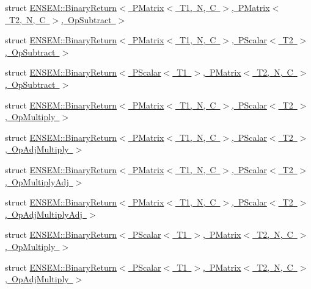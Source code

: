 \begin{DoxyCompactItemize}
\item 
struct \mbox{\hyperlink{structENSEM_1_1BinaryReturn_3_01PMatrix_3_01T1_00_01N_00_01C_01_4_00_01PMatrix_3_01T2_00_01N_00_01C_01_4_00_01OpSubtract_01_4}{E\+N\+S\+E\+M\+::\+Binary\+Return$<$ P\+Matrix$<$ T1, N, C $>$, P\+Matrix$<$ T2, N, C $>$, Op\+Subtract $>$}}
\item 
struct \mbox{\hyperlink{structENSEM_1_1BinaryReturn_3_01PMatrix_3_01T1_00_01N_00_01C_01_4_00_01PScalar_3_01T2_01_4_00_01OpSubtract_01_4}{E\+N\+S\+E\+M\+::\+Binary\+Return$<$ P\+Matrix$<$ T1, N, C $>$, P\+Scalar$<$ T2 $>$, Op\+Subtract $>$}}
\item 
struct \mbox{\hyperlink{structENSEM_1_1BinaryReturn_3_01PScalar_3_01T1_01_4_00_01PMatrix_3_01T2_00_01N_00_01C_01_4_00_01OpSubtract_01_4}{E\+N\+S\+E\+M\+::\+Binary\+Return$<$ P\+Scalar$<$ T1 $>$, P\+Matrix$<$ T2, N, C $>$, Op\+Subtract $>$}}
\item 
struct \mbox{\hyperlink{structENSEM_1_1BinaryReturn_3_01PMatrix_3_01T1_00_01N_00_01C_01_4_00_01PScalar_3_01T2_01_4_00_01OpMultiply_01_4}{E\+N\+S\+E\+M\+::\+Binary\+Return$<$ P\+Matrix$<$ T1, N, C $>$, P\+Scalar$<$ T2 $>$, Op\+Multiply $>$}}
\item 
struct \mbox{\hyperlink{structENSEM_1_1BinaryReturn_3_01PMatrix_3_01T1_00_01N_00_01C_01_4_00_01PScalar_3_01T2_01_4_00_01OpAdjMultiply_01_4}{E\+N\+S\+E\+M\+::\+Binary\+Return$<$ P\+Matrix$<$ T1, N, C $>$, P\+Scalar$<$ T2 $>$, Op\+Adj\+Multiply $>$}}
\item 
struct \mbox{\hyperlink{structENSEM_1_1BinaryReturn_3_01PMatrix_3_01T1_00_01N_00_01C_01_4_00_01PScalar_3_01T2_01_4_00_01OpMultiplyAdj_01_4}{E\+N\+S\+E\+M\+::\+Binary\+Return$<$ P\+Matrix$<$ T1, N, C $>$, P\+Scalar$<$ T2 $>$, Op\+Multiply\+Adj $>$}}
\item 
struct \mbox{\hyperlink{structENSEM_1_1BinaryReturn_3_01PMatrix_3_01T1_00_01N_00_01C_01_4_00_01PScalar_3_01T2_01_4_00_01OpAdjMultiplyAdj_01_4}{E\+N\+S\+E\+M\+::\+Binary\+Return$<$ P\+Matrix$<$ T1, N, C $>$, P\+Scalar$<$ T2 $>$, Op\+Adj\+Multiply\+Adj $>$}}
\item 
struct \mbox{\hyperlink{structENSEM_1_1BinaryReturn_3_01PScalar_3_01T1_01_4_00_01PMatrix_3_01T2_00_01N_00_01C_01_4_00_01OpMultiply_01_4}{E\+N\+S\+E\+M\+::\+Binary\+Return$<$ P\+Scalar$<$ T1 $>$, P\+Matrix$<$ T2, N, C $>$, Op\+Multiply $>$}}
\item 
struct \mbox{\hyperlink{structENSEM_1_1BinaryReturn_3_01PScalar_3_01T1_01_4_00_01PMatrix_3_01T2_00_01N_00_01C_01_4_00_01OpAdjMultiply_01_4}{E\+N\+S\+E\+M\+::\+Binary\+Return$<$ P\+Scalar$<$ T1 $>$, P\+Matrix$<$ T2, N, C $>$, Op\+Adj\+Multiply $>$}}

\end{DoxyCompactItemize}
